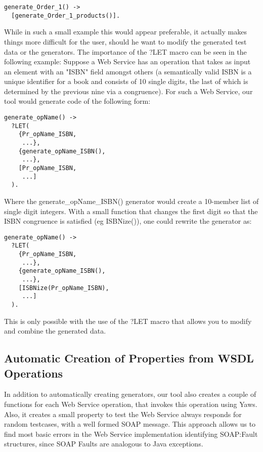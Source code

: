 \documentclass[submission,copyright,a4]{eptcs}
\begin{document}
\begin{lstlisting}
generate_Order_1() ->
  [generate_Order_1_products()].
\end{lstlisting}

While in such a small example this would appear preferable, it actually makes things more difficult for the user, should he want to modify the generated test data or the generators. The importance of the ?LET macro can be seen in the following example: Suppose a Web Service has an operation that takes as input an element with an "ISBN" field amongst others (a semantically valid ISBN is a unique identifier for a book and consists of 10 single digits, the last of which is determined by the previous nine via a congruence). For such a Web Service, our tool would generate code of the following form:

\begin{lstlisting}
generate_opName() ->
  ?LET(
    {Pr_opName_ISBN,
     ...},
    {generate_opName_ISBN(),
     ...},
    [Pr_opName_ISBN,
     ...]
  ).
\end{lstlisting}

Where the generate\_opName\_ISBN() generator would create a 10-member list of single digit integers. With a small function that changes the first digit so that the ISBN congruence is satisfied (eg ISBNize()), one could rewrite the generator as:

\begin{lstlisting}
generate_opName() ->
  ?LET(
    {Pr_opName_ISBN,
     ...},
    {generate_opName_ISBN(),
     ...},
    [ISBNize(Pr_opName_ISBN),
     ...]
  ).
\end{lstlisting}

This is only possible with the use of the ?LET macro that allows you to modify and combine the generated data. 


\subsection{Automatic Creation of Properties from WSDL Operations}

In addition to automatically creating generators, our tool also creates a couple of functions for each Web Service operation, that invokes this operation using Yaws. Also, it creates a small property to test the Web Service always responds for random testcases, with a well formed SOAP message. This approach allows us to find most basic errors in the Web Service implementation identifying SOAP:Fault structures, since SOAP Faults are analogous to Java exceptions. 
\end{document}
